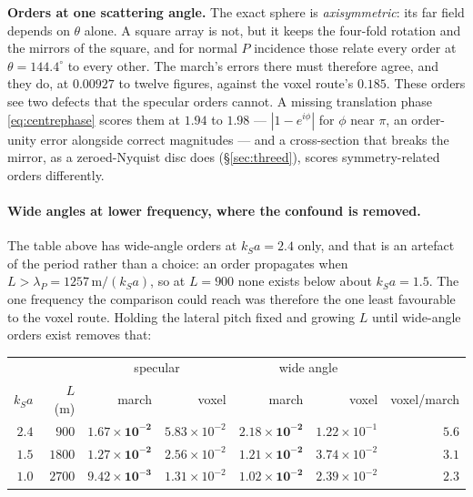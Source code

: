 \documentclass[11pt,a4paper]{article}
\begin{document}
\noindent
\textbf{Orders at one scattering angle.}  The exact sphere is
\emph{axisymmetric}: its far field depends on $\theta$ alone.  A square array
is not, but it keeps the four-fold rotation and the mirrors of the square, and
for normal $P$ incidence those relate every order at $\theta=144.4^{\circ}$ to
every other.  The march's errors there must therefore agree, and they do, at
$0.00927$ to twelve figures, against the voxel route's $0.185$.  These orders
see two defects that the specular orders cannot.  A missing translation phase
\eqref{eq:centrephase} scores them at $1.94$ to $1.98$ --- $|1-e^{i\phi}|$ for
$\phi$ near $\pi$, an order-unity error alongside correct magnitudes --- and a
cross-section that breaks the mirror, as a zeroed-Nyquist disc does
(\S\ref{sec:threed}), scores symmetry-related orders differently.

\paragraph{Wide angles at lower frequency, where the confound is removed.}
The table above has wide-angle orders at $k_Sa=2.4$ only, and that is an
artefact of the period rather than a choice: an order propagates when
$L>\lambda_P=1257\,\text{m}/(k_Sa)$, so at $L=900$ none exists below about
$k_Sa=1.5$.  The one frequency the comparison could reach was therefore the one
least favourable to the voxel route.  Holding the lateral pitch fixed and
growing $L$ until wide-angle orders exist removes that:

\begin{center}
\begin{tabular}{@{}rrrrrrr@{}}
\toprule
& & \multicolumn{2}{c}{specular} & \multicolumn{2}{c}{wide angle} & \\
\cmidrule(lr){3-4}\cmidrule(lr){5-6}
$k_Sa$ & $L$ (m) & march & voxel & march & voxel & voxel/march\\
\midrule
$2.4$ & $900$  & $\mathbf{1.67\times10^{-2}}$ & $5.83\times10^{-2}$
       & $\mathbf{2.18\times10^{-2}}$ & $1.22\times10^{-1}$ & $5.6$\\
$1.5$ & $1800$ & $\mathbf{1.27\times10^{-2}}$ & $2.56\times10^{-2}$
       & $\mathbf{1.21\times10^{-2}}$ & $3.74\times10^{-2}$ & $3.1$\\
$1.0$ & $2700$ & $\mathbf{9.42\times10^{-3}}$ & $1.31\times10^{-2}$
       & $\mathbf{1.02\times10^{-2}}$ & $2.39\times10^{-2}$ & $2.3$\\
\bottomrule
\end{tabular}
\end{center}
\end{document}
